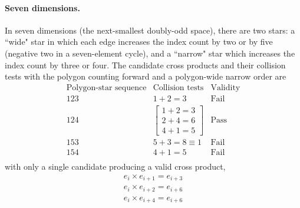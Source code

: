 \documentclass[11pt]{article}
\newcommand{\bv}[1][]{e_{#1}}
\begin{document}
\paragraph{Seven dimensions.} In seven dimensions (the next-smallest doubly-odd space), there are two stars: a ``wide" star in which each edge increases the index count by two or by five (negative two in a seven-element cycle), and a ``narrow" star which increases the index count by three or four. The candidate cross products and their collision tests with the polygon counting forward and a polygon-wide narrow order are
\begin{equation}
\begin{array}{c|c|c}
\text{Polygon-star sequence} & \text{Collision tests} & \text{Validity} \\\hline \hline
1 2 3 & 1+2 = 3 & \text{Fail} \\%
1 2 4 & \begin{bmatrix} 1+2=3 \\ 2+4=6 \\ 4+1 = 5 \end{bmatrix} &  \text{Pass}\\
1 5 3 & 5+3=8\equiv1 & \text{Fail} \\
1 5 4 & 4+1=5 & \text{Fail} \\
\end{array}
\end{equation}
with only a single candidate producing a valid cross product,
\begin{subequations}
\begin{align}
\bv[i]\times\bv[i+1] = \bv[i+3] \\
\bv[i]\times\bv[i+2] = \bv[i+6] \\
\bv[i]\times\bv[i+4] = \bv[i+6]
\end{align}
\end{subequations}
\end{document}
